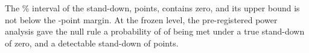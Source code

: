 The \wtthProtocolLevel\% interval of the stand-down, \wtthHaikuHOneCI{} points, contains zero, and its upper bound is not below the \wtthProtocolMargin-point margin.
At the frozen level, the pre-registered power analysis gave the null rule a probability of \wtthHaikuPowerHOnePNullDZero{} of being met under a true stand-down of zero, and a detectable stand-down of \wtthHaikuPowerHOneMDE{} points.
